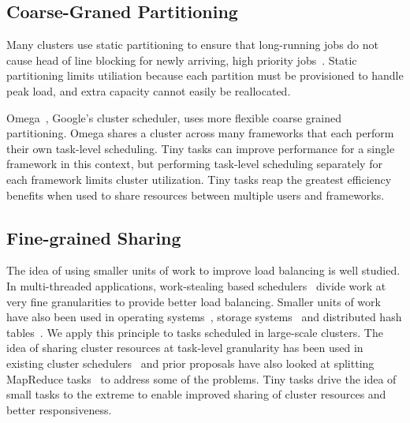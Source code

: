 \subsection{Coarse-Graned Partitioning}
Many clusters use static partitioning to ensure that long-running jobs do not
cause head of line blocking for newly arriving, high priority
jobs~\cite{thusoo2010data}. Static partitioning limits utiliation because each
partition must be provisioned to handle peak load, and extra capacity cannot
easily be reallocated.


Omega~\cite{wilkes2013omega}, Google's cluster scheduler, uses more flexible coarse
grained partitioning. Omega shares a cluster across many frameworks that
each perform their own task-level scheduling. Tiny tasks can improve performance
for a single framework in this context, but performing task-level scheduling
separately for each framework limits cluster utilization.
Tiny tasks reap the greatest efficiency benefits when used to share resources
between multiple users and frameworks.
\subsection{Fine-grained Sharing}
The idea of using smaller units of work to improve load balancing is well
studied.  In multi-threaded applications, work-stealing
based schedulers~\cite{blumofe1994scheduling} divide work at very fine granularities to provide better load
balancing.  Smaller units of work have also been used in
operating systems~\cite{sherman1972trace}, storage systems~\cite{chang2008bigtable,ghemawat2003google} and distributed hash tables~\cite{stoica2001chord}. We apply this
principle to tasks scheduled in large-scale clusters.  The
idea of sharing cluster resources at task-level granularity has been used in
existing cluster schedulers~\cite{hindman2011mesos, zaharia2010delay} and prior
proposals have also looked at splitting MapReduce tasks~\cite{bhatotia2011incoop} to
address some of the problems.
Tiny tasks drive the idea of small tasks to the extreme to enable improved
sharing of cluster resources
and better responsiveness.

